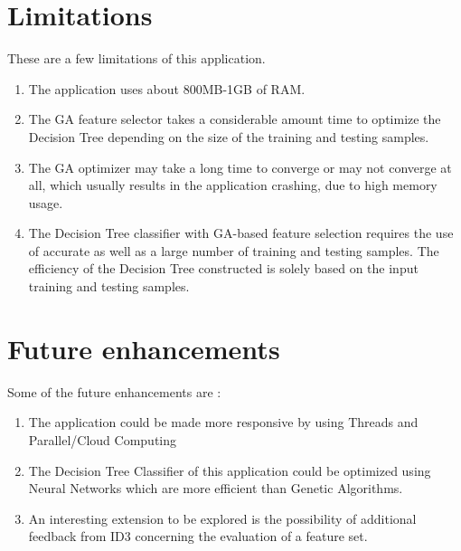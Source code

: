 \documentclass[12pt]{report}
\begin{document}
\section{Limitations}
These are a few limitations of this application.
\begin{enumerate}
\item{The application uses about 800MB-1GB of RAM.}

\item{The GA feature selector takes a considerable amount time to optimize the Decision Tree depending on the size of the training and testing samples.}
\item{The GA optimizer may take a long time to converge or may not converge at all, which usually results in the application crashing, due to high memory usage.}
\item{ The Decision Tree classifier with GA-based feature selection requires the use of accurate as well as a large number of training and testing samples. The efficiency of the Decision Tree constructed is solely based on the input training and testing samples.}

\end{enumerate}
\section{Future enhancements}
Some of the future enhancements are :
\begin{enumerate}
\item{The application could be made more responsive by using Threads and Parallel/Cloud Computing}
\item{The Decision Tree Classifier of this application could be optimized using Neural Networks which are more efficient than Genetic Algorithms.}
\item{An interesting extension to be explored is the possibility of
additional feedback from ID3 concerning the evaluation of a
feature set.}
\end{enumerate}
\end{document}
